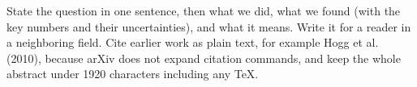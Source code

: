 State the question in one sentence, then what we did, what we found (with the key numbers and their uncertainties), and what it means. Write it for a reader in a neighboring field. Cite earlier work as plain text, for example Hogg et al. (2010), because arXiv does not expand citation commands, and keep the whole abstract under 1920 characters including any TeX.
